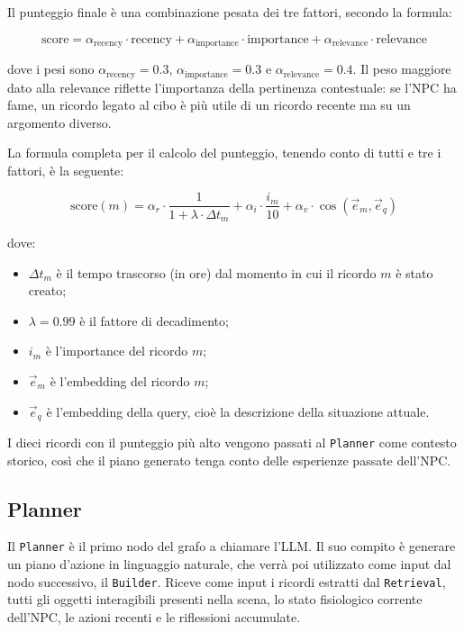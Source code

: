 Il punteggio finale è una combinazione pesata dei tre fattori, secondo la formula:

\begin{equation}
	\text{score} = \alpha_{\text{recency}} \cdot \text{recency} + \alpha_{\text{importance}} \cdot \text{importance} + \alpha_{\text{relevance}} \cdot \text{relevance}
\end{equation}

dove i pesi sono $\alpha_{\text{recency}} = 0.3$, $\alpha_{\text{importance}} = 0.3$ e $\alpha_{\text{relevance}} = 0.4$. Il peso maggiore dato alla relevance riflette l'importanza della pertinenza contestuale: se l'NPC ha fame, un ricordo legato al cibo è più utile di un ricordo recente ma su un argomento diverso.

La formula completa per il calcolo del punteggio, tenendo conto di tutti e tre i fattori, è la seguente:

\begin{equation}
	\text{score}(m) = \alpha_r \cdot \frac{1}{1 + \lambda \cdot \Delta t_m} + \alpha_i \cdot \frac{i_m}{10} + \alpha_v \cdot \cos(\vec{e}_m, \vec{e}_q)
\end{equation}

dove:
\begin{itemize}
	\item $\Delta t_m$ è il tempo trascorso (in ore) dal momento in cui il ricordo $m$ è stato creato;
	\item $\lambda = 0.99$ è il fattore di decadimento;
	\item $i_m$ è l'importance del ricordo $m$;
	\item $\vec{e}_m$ è l'embedding del ricordo $m$;
	\item $\vec{e}_q$ è l'embedding della query, cioè la descrizione della situazione attuale.
\end{itemize}

I dieci ricordi con il punteggio più alto vengono passati al \texttt{Planner} come contesto storico, così che il piano generato tenga conto delle esperienze passate dell'NPC.

\subsection{Planner}

Il \texttt{Planner} è il primo nodo del grafo a chiamare l'LLM. Il suo compito è generare un piano d'azione in linguaggio naturale, che verrà poi utilizzato come input dal nodo successivo, il \texttt{Builder}. Riceve come input i ricordi estratti dal \texttt{Retrieval}, tutti gli oggetti interagibili presenti nella scena, lo stato fisiologico corrente dell'NPC, le azioni recenti e le riflessioni accumulate.

